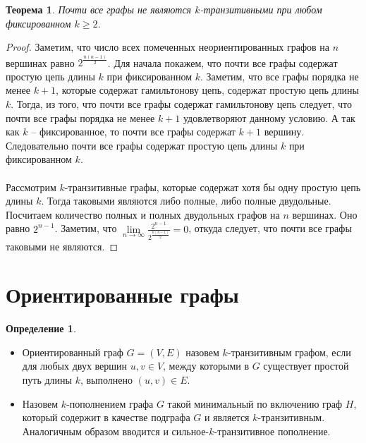 \documentclass[a4paper,12pt]{article}
\theoremstyle{plain}
\newtheorem{theorem}{Теорема}
\theoremstyle{definition}
\newtheorem{definition}{Определение}
\begin{document}
\begin{theorem}\label{t5}
		{\it Почти все графы  \cite{11} не являются $k$-транзитивными при любом фиксированном $k \geq 2 $.}
	\end{theorem}
    \begin{proof}
    
    Заметим, что число всех помеченных неориентированных графов на $n$ вершинах равно $2^{\frac{n(n-1)}{2}}$. Для начала покажем, что почти все графы содержат простую цепь длины $k$ при фиксированном $k$. Заметим, что все графы порядка не менее $k+1$, которые содержат гамильтонову цепь, содержат простую цепь длины $k$. Тогда, из того, что почти все графы содержат гамильтонову цепь следует, что почти все графы порядка не менее $k+1$ удовлетворяют данному условию. А так как $k$ -- фиксированное, то почти все графы содержат $k+1$ вершину. Следовательно почти все графы содержат простую цепь длины $k$ при фиксированном $k$.
    \\
    \\
    Рассмотрим $k$-транзитивные графы, которые содержат хотя бы одну простую цепь длины $k$. Тогда таковыми являются либо полные, либо полные двудольные. Посчитаем количество полных и полных двудольных графов на $n$ вершинах. Оно равно $2^{n-1}$.  Заметим, что
    $\lim\limits_{n \to \infty } \frac{2^{n-1}}{2^{\frac{n(n-1)}{2}}}=0$, откуда следует, что почти все графы таковыми не являются.
    \end{proof}
    
    
	\begin{figure}[H]
  \centering
     \hspace {0.5in}
     \caption {}
  \label{fig:twopicture} 
\end{figure}
	
	
	
	\section{{Ориентированные графы}}
	
	
	\begin{definition}
	\
\begin{itemize}
\item Ориентированный граф $G=(V, E)$ назовем $k$-транзитивным графом, если для любых двух вершин $u,v \in V$, между которыми в $G$ существует простой путь длины $k$, выполнено $ (u, v) \in E$.
\item  Назовем $k$-пополнением графа $G$ такой минимальный по включению граф $H$, который содержит в качестве подграфа $G$ и является $k$-транзитивным. Аналогичным образом вводится и сильное-$k$-транзитивное пополнение.
\end{itemize}
\end{definition}
	
\end{document}
